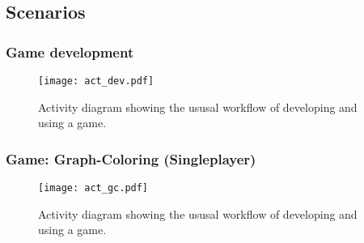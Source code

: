 \subsection{Scenarios}

\subsubsection{Game development}
\begin{figure}[h!]
	\centering
	\texttt{[image: act\_dev.pdf]}
	\caption{Activity diagram showing the ususal workflow of developing and using a game.}
	\label{img:ACTDEV}
\end{figure}
\subsubsection{Game: Graph-Coloring (Singleplayer)}
\begin{figure}[h!]
	\centering
	\texttt{[image: act\_gc.pdf]}
	\caption{Activity diagram showing the ususal workflow of developing and using a game.}
	\label{img:ACTGC}
\end{figure}